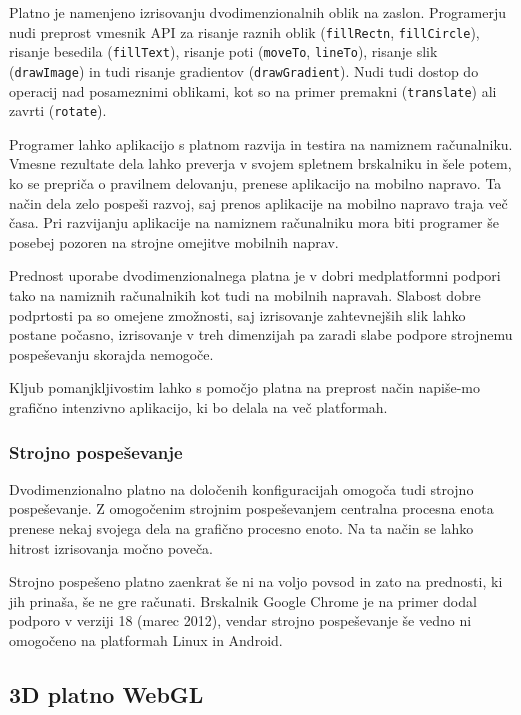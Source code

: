 
Platno je namenjeno izrisovanju dvodimenzionalnih oblik na zaslon. Programerju nudi preprost vmesnik API za risanje raznih oblik (\texttt{fillRectn}, \texttt{fillCircle}), risanje besedila (\texttt{fillText}), risanje poti (\texttt{moveTo}, \texttt{lineTo}), risanje slik (\texttt{drawImage}) in tudi risanje gradientov (\texttt{drawGradient}). Nudi tudi dostop do operacij nad posameznimi oblikami, kot so na primer premakni (\texttt{translate}) ali zavrti (\texttt{rotate}). 

Programer lahko aplikacijo s platnom razvija in testira na namiznem računalniku. Vmesne rezultate dela lahko preverja v svojem spletnem brskalniku in šele potem, ko se prepriča o pravilnem delovanju, prenese aplikacijo na mobilno napravo. Ta način dela zelo pospeši razvoj, saj prenos aplikacije na mobilno napravo traja več časa. Pri razvijanju aplikacije na namiznem računalniku mora biti programer še posebej pozoren na strojne omejitve mobilnih naprav. 

Prednost uporabe dvodimenzionalnega platna je v dobri medplatformni podpori tako na namiznih računalnikih kot tudi na mobilnih napravah. Slabost dobre podprtosti pa so omejene zmožnosti, saj izrisovanje zahtevnejših slik lahko postane počasno, izrisovanje v treh dimenzijah pa zaradi slabe podpore strojnemu pospeševanju skorajda nemogoče. 

Kljub pomanjkljivostim lahko s pomočjo platna na preprost način napiše-mo grafično intenzivno aplikacijo, ki bo delala na več platformah. 

\subsubsection{Strojno pospeševanje}

Dvodimenzionalno platno na določenih konfiguracijah omogoča tudi strojno pospeševanje. Z omogočenim strojnim pospeševanjem centralna procesna enota prenese nekaj svojega dela na grafično procesno enoto. Na ta način se lahko hitrost izrisovanja močno poveča.

Strojno pospešeno platno zaenkrat še ni na voljo povsod in zato na prednosti, ki jih prinaša, še ne gre računati. Brskalnik Google Chrome je na primer dodal podporo v verziji 18 (marec 2012), vendar strojno pospeševanje še vedno ni omogočeno na platformah Linux in Android.

\subsection{3D platno WebGL}
\label{sec:WebGL}

